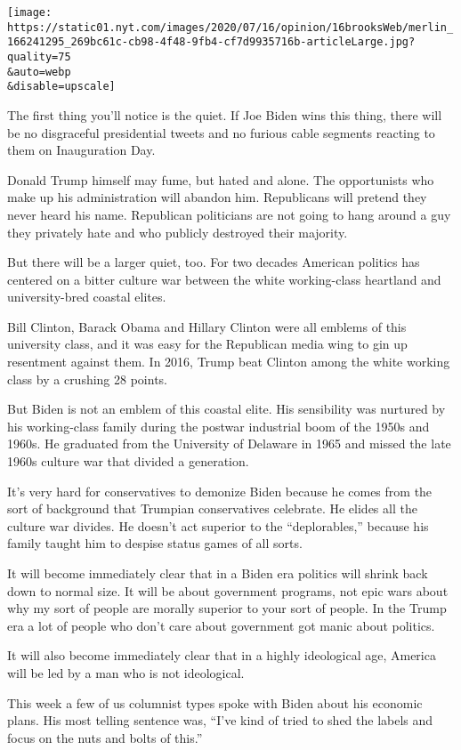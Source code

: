 \texttt{[image: https://static01.nyt.com/images/2020/07/16/opinion/16brooksWeb/merlin\_166241295\_269bc61c-cb98-4f48-9fb4-cf7d9935716b-articleLarge.jpg?quality=75\\\&auto=webp\\\&disable=upscale]}

The first thing you'll notice is the quiet. If Joe Biden wins this
thing, there will be no disgraceful presidential tweets and no furious
cable segments reacting to them on Inauguration Day.

Donald Trump himself may fume, but hated and alone. The opportunists who
make up his administration will abandon him. Republicans will pretend
they never heard his name. Republican politicians are not going to hang
around a guy they privately hate and who publicly destroyed their
majority.

But there will be a larger quiet, too. For two decades American politics
has centered on a bitter culture war between the white working-class
heartland and university-bred coastal elites.

Bill Clinton, Barack Obama and Hillary Clinton were all emblems of this
university class, and it was easy for the Republican media wing to gin
up resentment against them. In 2016, Trump beat Clinton among the white
working class by a crushing 28 points.

But Biden is not an emblem of this coastal elite. His sensibility was
nurtured by his working-class family during the postwar industrial boom
of the 1950s and 1960s. He graduated from the University of Delaware in
1965 and missed the late 1960s culture war that divided a generation.

It's very hard for conservatives to demonize Biden because he comes from
the sort of background that Trumpian conservatives celebrate. He elides
all the culture war divides. He doesn't act superior to the
``deplorables,'' because his family taught him to despise status games
of all sorts.

It will become immediately clear that in a Biden era politics will
shrink back down to normal size. It will be about government programs,
not epic wars about why my sort of people are morally superior to your
sort of people. In the Trump era a lot of people who don't care about
government got manic about politics.

It will also become immediately clear that in a highly ideological age,
America will be led by a man who is not ideological.

This week a few of us columnist types spoke with Biden about his
economic plans. His most telling sentence was, ``I've kind of tried to
shed the labels and focus on the nuts and bolts of this.''

